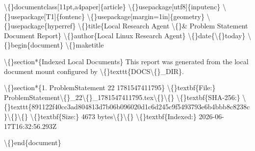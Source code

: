 \textbackslash\{\}documentclass[11pt,a4paper]\{article\}
\textbackslash\{\}usepackage[utf8]\{inputenc\}
\textbackslash\{\}usepackage[T1]\{fontenc\}
\textbackslash\{\}usepackage[margin=1in]\{geometry\}
\textbackslash\{\}usepackage\{hyperref\}
\textbackslash\{\}title\{Local Research Agent \textbackslash\{\}\& Problem Statement Document Report\}
\textbackslash\{\}author\{Local Linux Research Agent\}
\textbackslash\{\}date\{\textbackslash\{\}today\}
\textbackslash\{\}begin\{document\}
\textbackslash\{\}maketitle


\textbackslash\{\}section*\{Indexed Local Documents\}
This report was generated from the local document mount configured by \textbackslash\{\}texttt\{DOCS\textbackslash\{\}\_DIR\}.

\textbackslash\{\}section*\{1. ProblemStatement 22 1781547411795\}
\textbackslash\{\}textbf\{File:\} ProblemStatement\textbackslash\{\}\_22\textbackslash\{\}\_1781547411795.tex\textbackslash\{\}\textbackslash\{\}
\textbackslash\{\}textbf\{SHA-256:\} \textbackslash\{\}texttt\{891122f40cc3ad804813d7b06b096020d1c6d245c9f5493793e6b4bbb8c8238c\}\textbackslash\{\}\textbackslash\{\}
\textbackslash\{\}textbf\{Size:\} 4673 bytes\textbackslash\{\}\textbackslash\{\}
\textbackslash\{\}textbf\{Indexed:\} 2026-06-17T16:32:56.293Z

\textbackslash\{\}end\{document\}
